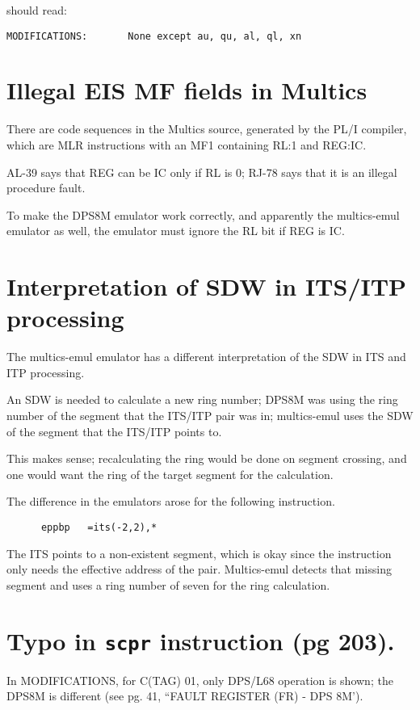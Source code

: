 \documentclass[notitlepage]{report}
\begin{document}
should read:

\begin{verbatim}
MODIFICATIONS:       None except au, qu, al, ql, xn
\end{verbatim}

\section{Illegal EIS MF fields in Multics}

There are code sequences in the Multics source, generated by the PL/I compiler,
which are MLR instructions with an MF1 containing RL:1 and REG:IC.

AL-39 says that REG can be IC only if RL is 0; RJ-78 says that it is an illegal procedure fault.

To make the DPS8M emulator work correctly, and apparently the multics-emul emulator as well, 
the emulator must ignore the RL bit if REG is IC.

\section{Interpretation of SDW in ITS/ITP processing}

The multics-emul emulator has a different interpretation of the SDW in ITS and ITP 
processing.

An SDW is needed to calculate a new ring number; DPS8M was using the ring number of the segment that the ITS/ITP pair was in; multics-emul uses the SDW of the segment that the ITS/ITP points to.

This makes sense; recalculating the ring would be done on segment crossing, and 
one would want the ring of the target segment for the calculation.

The difference in the emulators arose for the following instruction.

\begin{verbatim}
      eppbp   =its(-2,2),*
\end{verbatim}

The ITS points to a non-existent segment, which is okay since the instruction only needs the
effective address of the pair. Multics-emul detects that missing segment and uses a ring
number of seven for the ring calculation.


\section{Typo in \texttt{scpr} instruction (pg 203).}

In MODIFICATIONS, for C(TAG) 01, only DPS/L68 operation is shown;
the DPS8M is different (see pg. 41, ``FAULT REGISTER (FR) - DPS 8M').
\end{document}
